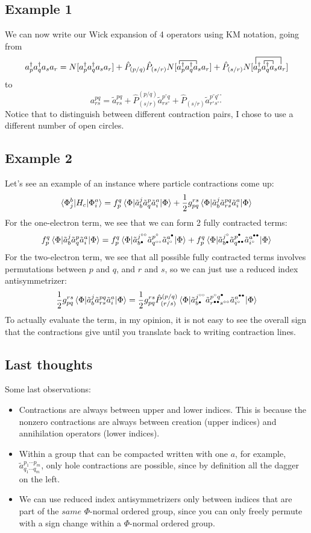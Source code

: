 \documentclass{article}
\newcommand{\tl}{\tilde}
\newcommand{\h}{\circ}
\newcommand{\p}{\bullet}
\newcommand{\fctr}{\contraction}
\newcommand{\dg}{\ensuremath{^\dagger} }
\newcommand{\cd}{\ensuremath{\cdots} }
\begin{document}
\subsection{Example 1}
We can now write our Wick expansion of 4 operators using KM notation, going from
\[a_p\dg  a_q\dg a_s a_r = N[a_p\dg  a_q\dg a_s a_r] + \hat{P}_{(p/q)}\hat{P}_{(s/r)} N[ \fctr{}{x}{{}_1a_q\dg }{x} a_p\dg  a_q\dg a_s a_r  ]  + \hat{P}_{(s/r)}  N[ \fctr{a_p\dg }{x}{{}_2}{x} \fctr[2ex]{}{x}{{}_1a_q\dg  a_s }{x} a_p\dg a_q\dg a_s a_r  ]   \]
to
\[a_{rs}^{pq} = \tl{a}_{rs}^{pq} +  \hat{P}^{(p/q)}_{(s/r)}  \tl{a}_{r s^\h}^{p^\h q}  + \hat{P}_{(s/r)}  \tl{a}_{r^{\h} s^{\h\h}}^{p^\h q^{\h\h}} \] 
Notice that to distinguish between different contraction pairs, I chose to use a different number of open circles. 
\subsection{Example 2 } 
Let's see an example of an instance where particle contractions come up: 
\[ \braket{\Phi_j^b | H_c | \Phi_i^a} =  f_p^q \braket{\Phi | \tl{a}_b^j \tl{a}_q^p \tl{a}_i^a | \Phi} + \frac{1}{2}g_{pq}^{rs} \braket{\Phi | \tl{a}_b^j \tl{a}^{pq}_{rs} \tl{a}_i^a | \Phi}   \]
For the one-electron term, we see that we can form 2 fully contracted terms:
\[ f_p^q \braket{\Phi | \tl{a}_b^j \tl{a}_q^p \tl{a}_i^a | \Phi}  = f_p^q \braket{\Phi | \tl{a}_{b^\p}^{j^{\h\h}} \tl{a}_{q^{\h\h}}^{p^\h} \tl{a}_{i^\h}^{a^\p} | \Phi}  + f_p^q \braket{\Phi | \tl{a}_{b^\p}^{j^\h} \tl{a}_{q^{\p\p}}^{p^\p} \tl{a}_{i^\h}^{a^{\p\p}} | \Phi} \]
For the two-electron term, we see that all possible fully contracted terms involves permutations between $p$ and $q$, and $r$ and $s$, so we can just use a reduced index antisymmetrizer:
\[ \frac{1}{2}g_{pq}^{rs} \braket{\Phi | \tl{a}_b^j \tl{a}^{pq}_{rs} \tl{a}_i^a | \Phi} = \frac{1}{2}g_{pq}^{rs}  \hat{P}^{(p/q)}_{(r/s)}  \braket{\Phi | \tl{a}_{b^\p}^{j^{\h\h}} \tl{a}^{{p^\h}{q^\p}}_{{r^{\p\p}}{s^{\h\h}}} \tl{a}_{i^\h}^{a^{\p\p}} | \Phi}  \]
To actually evaluate the term, in my opinion, it is not easy to see the overall sign that the contractions give until you translate back to writing contraction lines. 
\subsection{Last thoughts}
Some last observations:
\begin{itemize}
\item Contractions are always between upper and lower indices. This is because the nonzero contractions are always between creation (upper indices) and annihilation operators (lower indices).
\item Within a group that can be compacted written with one $a$, for example, $\tl{a}^{p_1 \cd p_m}_{q_1 \cd q_m} $, only hole contractions are possible, since by definition all the dagger on the left.
 \item We can use reduced index antisymmetrizers only between indices that are part of the $same$ $\Phi$-normal ordered group, since you can only freely permute with a sign change within a $\Phi$-normal ordered group. 
\end{itemize}
\end{document}
